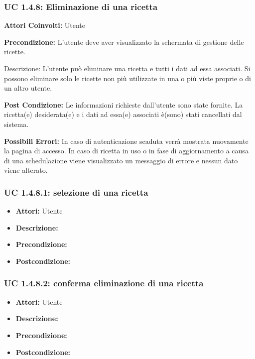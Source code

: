 \subsubsection{UC 1.4.8: Eliminazione di una ricetta}

\textbf{Attori Coinvolti:}
Utente

\textbf{Precondizione:}
L’utente deve aver visualizzato la schermata di gestione delle ricette.

Descrizione:
L’utente può eliminare una ricetta e tutti i dati ad essa associati.
Si possono eliminare solo le ricette non più utilizzate in una o più viste proprie o di un altro utente.    

\textbf{Post Condizione:}
Le informazioni richieste dall'utente sono state fornite.
La ricetta(e) desiderata(e) e i dati ad essa(e) associati è(sono) stati cancellati dal sistema.

\textbf{Possibili Errori:}
In caso di autenticazione scaduta verrà mostrata nuovamente la pagina di accesso.
In caso di ricetta in uso o in fase di aggiornamento a causa di una schedulazione viene visualizzato un messaggio di errore e nessun dato viene alterato.

\subsubsection{UC 1.4.8.1: selezione di una ricetta}

\begin{itemize}
\item \textbf{Attori:} Utente
\item \textbf{Descrizione:} 
\item \textbf{Precondizione:} 
\item \textbf{Postcondizione:} 
\end{itemize}

\subsubsection{UC 1.4.8.2: conferma eliminazione di una ricetta}

\begin{itemize}
\item \textbf{Attori:} Utente
\item \textbf{Descrizione:} 
\item \textbf{Precondizione:} 
\item \textbf{Postcondizione:} 
\end{itemize}

